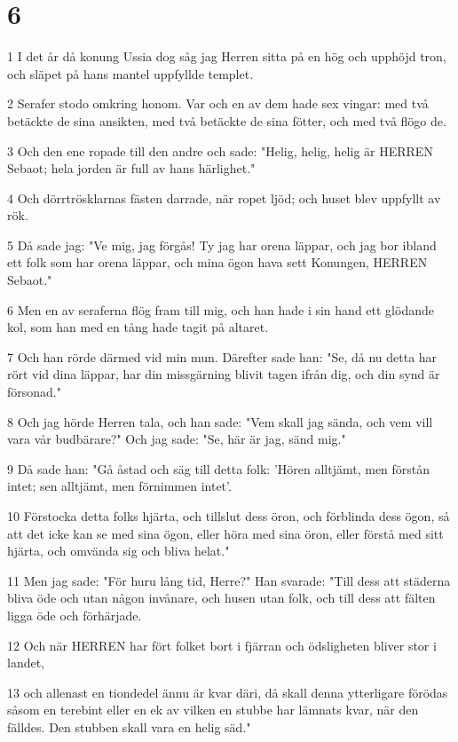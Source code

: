 \chapter{6}

\par 1 I det år då konung Ussia dog såg jag Herren sitta på en hög och upphöjd tron, och släpet på hans mantel uppfyllde templet.
\par 2 Serafer stodo omkring honom. Var och en av dem hade sex vingar: med två betäckte de sina ansikten, med två betäckte de sina fötter, och med två flögo de.
\par 3 Och den ene ropade till den andre och sade: "Helig, helig, helig är HERREN Sebaot; hela jorden är full av hans härlighet."
\par 4 Och dörrtrösklarnas fästen darrade, när ropet ljöd; och huset blev uppfyllt av rök.
\par 5 Då sade jag: "Ve mig, jag förgås! Ty jag har orena läppar, och jag bor ibland ett folk som har orena läppar, och mina ögon hava sett Konungen, HERREN Sebaot."
\par 6 Men en av seraferna flög fram till mig, och han hade i sin hand ett glödande kol, som han med en tång hade tagit på altaret.
\par 7 Och han rörde därmed vid min mun. Därefter sade han: "Se, då nu detta har rört vid dina läppar, har din missgärning blivit tagen ifrån dig, och din synd är försonad."
\par 8 Och jag hörde Herren tala, och han sade: "Vem skall jag sända, och vem vill vara vår budbärare?" Och jag sade: "Se, här är jag, sänd mig."
\par 9 Då sade han: "Gå åstad och säg till detta folk: 'Hören alltjämt, men förstån intet; sen alltjämt, men förnimmen intet'.
\par 10 Förstocka detta folks hjärta, och tillslut dess öron, och förblinda dess ögon, så att det icke kan se med sina ögon, eller höra med sina öron, eller förstå med sitt hjärta, och omvända sig och bliva helat."
\par 11 Men jag sade: "För huru lång tid, Herre?" Han svarade: "Till dess att städerna bliva öde och utan någon invånare, och husen utan folk, och till dess att fälten ligga öde och förhärjade.
\par 12 Och när HERREN har fört folket bort i fjärran och ödsligheten bliver stor i landet,
\par 13 och allenast en tiondedel ännu är kvar däri, då skall denna ytterligare förödas såsom en terebint eller en ek av vilken en stubbe har lämnats kvar, när den fälldes. Den stubben skall vara en helig säd."

